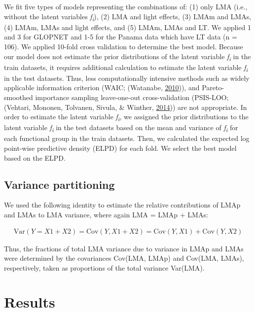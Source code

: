 \documentclass[12pt,]{article}
\theoremstyle{definition}
\theoremstyle{definition}
\theoremstyle{definition}
\theoremstyle{remark}
\begin{document}
We fit five types of models representing the combinations of: (1) only
LMA (i.e., without the latent variables \emph{f\textsubscript{i}}), (2)
LMA and light effects, (3) LMAm and LMAs, (4) LMAm, LMAs and light
effects, and (5) LMAm, LMAs and LT. We applied 1 and 3 for GLOPNET and
1-5 for the Panama data which have LT data (n = 106). We applied 10-fold
cross validation to determine the best model. Because our model does not
estimate the prior distributions of the latent variable
\emph{f\textsubscript{i}} in the train datasets, it requires additional
calculation to estimate the latent variable \emph{f\textsubscript{i}} in
the test datasets. Thus, less computationally intensive methods such as
widely applicable information criterion (WAIC; (Watanabe,
\protect\hyperlink{ref-Watanabe2010}{2010})), and Pareto-smoothed
importance sampling leave-one-out cross-validation (PSIS-LOO; (Vehtari,
Mononen, Tolvanen, Sivula, \& Winther,
\protect\hyperlink{ref-Vehtari2014}{2014})) are not appropriate. In
order to estimate the latent variable \emph{f\textsubscript{i}}, we
assigned the prior distributions to the latent variable
\emph{f\textsubscript{i}} in the test datasets based on the mean and
variance of \emph{f\textsubscript{i}} for each functional group in the
train datasets. Then, we calculated the expected log point-wise
predictive density (ELPD) for each fold. We select the best model based
on the ELPD.

\hypertarget{variance-partitioning}{%
\subsection{Variance partitioning}\label{variance-partitioning}}

We used the following identity to estimate the relative contributions of
LMAp and LMAs to LMA variance, where again LMA = LMAp + LMAs:

\begin{align}
\mathrm{Var}(Y = X1 + X2) = \mathrm{Cov}(Y, X1+X2) = \mathrm{Cov}(Y,X1) + \mathrm{Cov}(Y,X2) \label{eq:var}
\end{align}

Thus, the fractions of total LMA variance due to variance in LMAp and
LMAs were determined by the covariances Cov(LMA, LMAp) and Cov(LMA,
LMAs), respectively, taken as proportions of the total variance
Var(LMA).

\hypertarget{results}{%
\section{Results}\label{results}}
\end{document}
